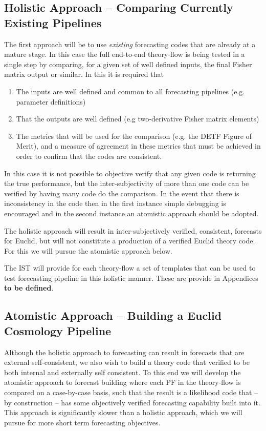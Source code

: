 \subsection{Holistic Approach -- Comparing Currently Existing Pipelines}
The first approach will be to use \emph{existing} forecasting codes that are already at a mature stage. In this case
the full end-to-end theory-flow is being tested in a single step by comparing, for a given set of well defined inputs, 
the final Fisher matrix output or similar. In this it is required that
\begin{enumerate} 
\item 
The inputs are well defined and common to all forecasting pipelines (e.g. parameter definitions) 
\item 
That the outputs are well defined (e.g two-derivative Fisher matrix elements)
\item 
The metrics that will be used for the comparison (e.g. the DETF Figure of Merit), and a measure of agreement 
in these metrics that must be achieved in order to confirm that the codes are consistent.
\end{enumerate} 
In this case it is not possible to objective verify that any given code is returning the true performance, 
but the inter-subjectivity of more than one code can be verified by having many code do the comparison. 
In the event that there is inconsistency in the code then in the first instance simple debugging is encouraged and 
in the second instance an atomistic approach should be adopted. 

The holistic approach will result in inter-subjectively verified, consistent, forecasts for Euclid, but will not 
constitute a production of a verified Euclid theory code. For this we will pursue the atomistic approach below. 

The IST will provide for each theory-flow a set of templates that can be used to test forecasting pipeline in 
this holistic manner. These are provide in Appendices {\bf to be defined}. 

\subsection{Atomistic Approach -- Building a Euclid Cosmology Pipeline}  
Although the holistic approach to forecasting can result in forecasts that are external self-consistent, we also 
wish to build a theory code that verified to be both internal and externally self consistent. To this end 
we will develop the atomistic approach to forecast building where each PF in the theory-flow is compared on a case-by-case
basis, such that the result is a likelihood code that -- by construction -- has some objectively verified forecasting 
capability built into it. This approach is significantly slower than a holistic approach, which we will pursue for 
more short term forecasting objectives. 

